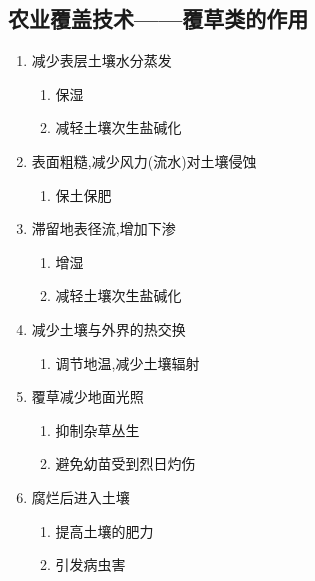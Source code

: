 \documentclass[a4paper]{article}
\begin{document}
    \subsection{农业覆盖技术——覆草类的作用}
    \begin{enumerate}
        \item 减少表层土壤水分蒸发
        \begin{enumerate}
            \item 保湿
            \item 减轻土壤次生盐碱化
        \end{enumerate}
        \item 表面粗糙,减少风力(流水)对土壤侵蚀
        \begin{enumerate}
            \item 保土保肥
        \end{enumerate}
        \item 滞留地表径流,增加下渗
        \begin{enumerate}
            \item 增湿
            \item 减轻土壤次生盐碱化
        \end{enumerate}
        \item 减少土壤与外界的热交换
        \begin{enumerate}
            \item 调节地温,减少土壤辐射
        \end{enumerate}
        \item 覆草减少地面光照
        \begin{enumerate}
            \item 抑制杂草丛生
            \item 避免幼苗受到烈日灼伤
        \end{enumerate}
        \item 腐烂后进入土壤
        \begin{enumerate}
            \item 提高土壤的肥力
            \item 引发病虫害
        \end{enumerate}
    \end{enumerate}
\end{document}
